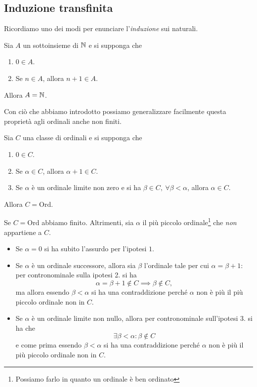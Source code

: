 \subsection{Induzione transfinita}
Ricordiamo uno dei modi per enunciare l'\textit{induzione} sui naturali. 
\begin{theoremaqed}[Induzione]
	Sia $A$ un sottoinsieme di $\mathbb{N}$ e si supponga che
	\begin{enumerate}
		\item $0\in A$.
		\item Se $n\in A$, allora $n+1\in A$.
	\end{enumerate}
	Allora $A=\mathbb{N}$.
\end{theoremaqed}
Con ciò che abbiamo introdotto possiamo generalizzare facilmente questa proprietà agli ordinali anche non finiti.
\begin{theorema}
	Sia $C$ una classe di ordinali e si supponga che
	\begin{enumerate}
		\item $0\in C$.
		\item Se $\alpha\in C$, allora $\alpha+1\in C$.
		\item Se $\alpha$ è un ordinale limite non zero e si ha $\beta\in C,\ \forall \beta<\alpha$, allora $\alpha\in C$.
	\end{enumerate}
Allora $C=\mathrm{Ord}$.
\end{theorema}
\begin{demonstration}
	Se $C=\mathrm{Ord}$ abbiamo finito. Altrimenti, sia $\alpha$ il più piccolo ordinale\footnote{Possiamo farlo in quanto un ordinale è ben ordinato} che \textit{non} appartiene a $C$.
	\begin{itemize}
		\item Se $\alpha=0$ si ha subito l'assurdo per l'ipotesi $1$.
		\item Se $\alpha$ è un ordinale successore, allora sia $\beta$ l'ordinale tale per cui $\alpha=\beta+1$: per contronominale sulla ipotesi 2. si ha
		\begin{equation*}
			\alpha=\beta+1\notin C\implies \beta\notin C,
		\end{equation*}
		ma allora essendo $\beta<\alpha$ si ha una contraddizione perché $\alpha$ non è più il più piccolo ordinale non in $C$.
		\item Se $\alpha$ è un ordinale limite non nullo, allora per contronominale sull'ipotesi $3.$ si ha che
		\begin{equation*}
			\exists \beta<\alpha\colon\beta\notin C
		\end{equation*}
		e come prima essendo $\beta<\alpha$ si ha una contraddizione perché $\alpha$ non è più il più piccolo ordinale non in $C$.\qedhere
	\end{itemize}
\end{demonstration}
